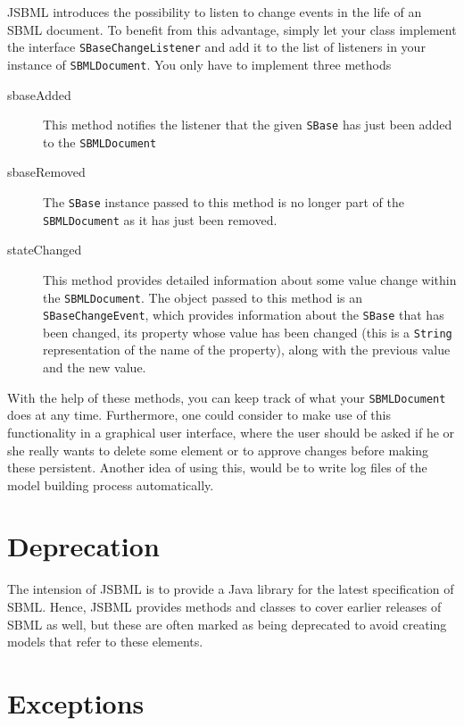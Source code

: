 \documentclass[
  BCOR12mm,
  letterpaper,
  11pt,
  headsepline,
  pointlessnumbers,
  tablecaptionabove,
  headinclude,
  appendixprefix,
  idxtotoc,
  bibtotoc,
  twoside,
  titlepage
]{scrartcl}
\begin{document}
JSBML introduces the possibility to listen to change events in the life of an
SBML document. To benefit from this advantage, simply let your class implement
the interface \verb!SBaseChangeListener! and add it to the list of listeners in
your instance of  \verb!SBMLDocument!. You only have to implement three methods
\begin{description}
 \item[sbaseAdded] This method notifies the listener that the given \verb!SBase!
   has just been added to the \verb!SBMLDocument!
 \item[sbaseRemoved] The \verb!SBase! instance passed to this method is no
   longer part of the \verb!SBMLDocument! as it has just been removed.
 \item[stateChanged] This method provides detailed information about some value
   change within the \verb!SBMLDocument!. The object passed to this method is
   an \verb!SBaseChangeEvent!, which provides information about the \verb!SBase!
   that has been changed, its property whose value has been changed (this is a
   \verb!String! representation of the name of the property), along with the
   previous value and the new value.
\end{description}
With the help of these methods, you can keep track of what your
\verb!SBMLDocument! does at any time. Furthermore, one could consider to make
use of this functionality in a graphical user interface, where the user should
be asked if he or she really wants to delete some element or to approve changes
before making these persistent. Another idea of using this, would be to write
log files of the model building process automatically.


\section{Deprecation}

The intension of JSBML is to provide a Java library for the latest 
specification of SBML. Hence, JSBML provides methods and classes to
cover earlier releases of SBML as well, but these are often marked
as being deprecated to avoid creating models that refer to these 
elements.

\section{Exceptions}
\end{document}
